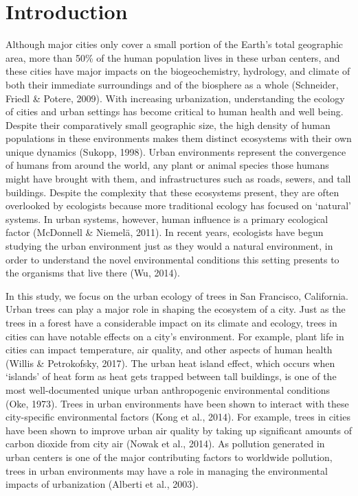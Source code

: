 \documentclass[fleqn,10pt,lineno]{wlpeerj} %
\begin{document}
\hypertarget{introduction}{%
\section*{Introduction}\label{introduction}}

Although major cities only cover a small portion of the Earth's total geographic area, more than 50\% of the human population lives in these urban centers, and these cities have major impacts on the biogeochemistry, hydrology, and climate of both their immediate surroundings and of the biosphere as a whole (Schneider, Friedl \& Potere, 2009). With increasing urbanization, understanding the ecology of cities and urban settings has become critical to human health and well being. Despite their comparatively small geographic size, the high density of human populations in these environments makes them distinct ecosystems with their own unique dynamics (Sukopp, 1998). Urban environments represent the convergence of humans from around the world, any plant or animal species those humans might have brought with them, and infrastructures such as roads, sewers, and tall buildings. Despite the complexity that these ecosystems present, they are often overlooked by ecologists because more traditional ecology has focused on `natural' systems. In urban systems, however, human influence is a primary ecological factor (McDonnell \& Niemelä, 2011). In recent years, ecologists have begun studying the urban environment just as they would a natural environment, in order to understand the novel environmental conditions this setting presents to the organisms that live there (Wu, 2014).

In this study, we focus on the urban ecology of trees in San Francisco, California. Urban trees can play a major role in shaping the ecosystem of a city. Just as the trees in a forest have a considerable impact on its climate and ecology, trees in cities can have notable effects on a city's environment. For example, plant life in cities can impact temperature, air quality, and other aspects of human health (Willis \& Petrokofsky, 2017). The urban heat island effect, which occurs when `islands' of heat form as heat gets trapped between tall buildings, is one of the most well-documented unique urban anthropogenic environmental conditions (Oke, 1973). Trees in urban environments have been shown to interact with these city-specific environmental factors (Kong et al., 2014). For example, trees in cities have been shown to improve urban air quality by taking up significant amounts of carbon dioxide from city air (Nowak et al., 2014). As pollution generated in urban centers is one of the major contributing factors to worldwide pollution, trees in urban environments may have a role in managing the environmental impacts of urbanization (Alberti et al., 2003).
\end{document}
